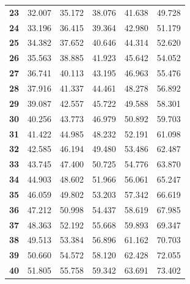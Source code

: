 \begin{center}
\begin{tabular}{c|c|c|c|c|c}
\textbf{23} & 32.007 & 35.172 & 38.076 & 41.638 & 49.728 \\
\textbf{24} & 33.196 & 36.415 & 39.364 & 42.980 & 51.179 \\
\textbf{25} & 34.382 & 37.652 & 40.646 & 44.314 & 52.620 \\
\textbf{26} & 35.563 & 38.885 & 41.923 & 45.642 & 54.052 \\
\textbf{27} & 36.741 & 40.113 & 43.195 & 46.963 & 55.476 \\
\textbf{28} & 37.916 & 41.337 & 44.461 & 48.278 & 56.892 \\
\textbf{29} & 39.087 & 42.557 & 45.722 & 49.588 & 58.301 \\
\textbf{30} & 40.256 & 43.773 & 46.979 & 50.892 & 59.703 \\
\textbf{31} & 41.422 & 44.985 & 48.232 & 52.191 & 61.098 \\
\textbf{32} & 42.585 & 46.194 & 49.480 & 53.486 & 62.487 \\
\textbf{33} & 43.745 & 47.400 & 50.725 & 54.776 & 63.870 \\
\textbf{34} & 44.903 & 48.602 & 51.966 & 56.061 & 65.247 \\
\textbf{35} & 46.059 & 49.802 & 53.203 & 57.342 & 66.619 \\
\textbf{36} & 47.212 & 50.998 & 54.437 & 58.619 & 67.985 \\
\textbf{37} & 48.363 & 52.192 & 55.668 & 59.893 & 69.347 \\
\textbf{38} & 49.513 & 53.384 & 56.896 & 61.162 & 70.703 \\
\textbf{39} & 50.660 & 54.572 & 58.120 & 62.428 & 72.055 \\
\textbf{40} & 51.805 & 55.758 & 59.342 & 63.691 & 73.402 \bstrut\\
\hline
\end{tabular}
\end{center}